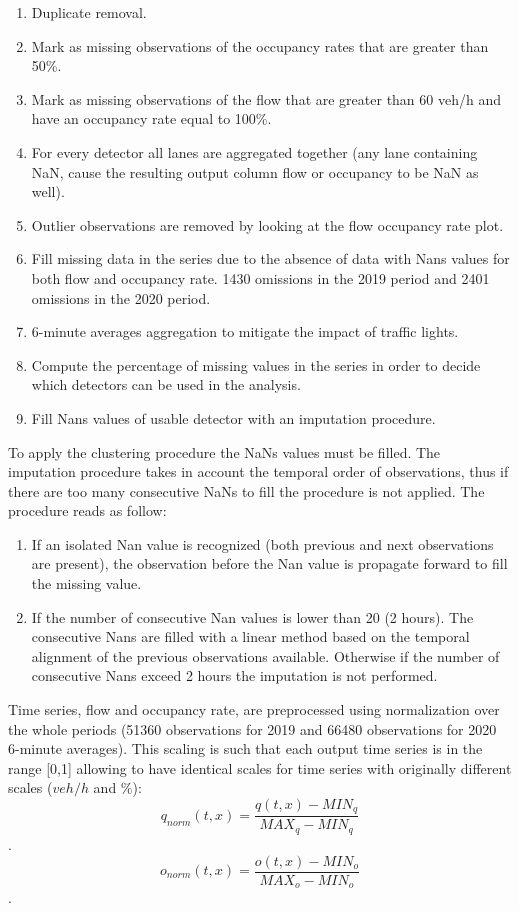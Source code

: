 \documentclass[11pt]{article}
\begin{document}
\begin{enumerate}
\def\labelenumi{\arabic{enumi}.}
\item
  Duplicate removal.
\item
  Mark as missing observations of the occupancy rates that are greater
  than 50\%.
\item
  Mark as missing observations of the flow that are greater than 60
  veh/h and have an occupancy rate equal to 100\%.
\item
  For every detector all lanes are aggregated together (any lane
  containing NaN, cause the resulting output column flow or occupancy to
  be NaN as well).
\item
  Outlier observations are removed by looking at the flow occupancy rate
  plot.
\item
  Fill missing data in the series due to the absence of data with Nans
  values for both flow and occupancy rate. 1430 omissions in the 2019
  period and 2401 omissions in the 2020 period.
\item
  6-minute averages aggregation to mitigate the impact of traffic
  lights.
\item
  Compute the percentage of missing values in the series in order to
  decide which detectors can be used in the analysis.
\item
  Fill Nans values of usable detector with an imputation procedure.
\end{enumerate}

To apply the clustering procedure the NaNs values must be filled. The
imputation procedure takes in account the temporal order of
observations, thus if there are too many consecutive NaNs to fill the
procedure is not applied. The procedure reads as follow:

\begin{enumerate}
\def\labelenumi{\arabic{enumi}.}
\item
  If an isolated Nan value is recognized (both previous and next
  observations are present), the observation before the Nan value is
  propagate forward to fill the missing value.
\item
  If the number of consecutive Nan values is lower than 20 (2 hours).
  The consecutive Nans are filled with a linear method based on the
  temporal alignment of the previous observations available. Otherwise
  if the number of consecutive Nans exceed 2 hours the imputation is not
  performed.
\end{enumerate}

    Time series, flow and occupancy rate, are preprocessed using
normalization over the whole periods (51360 observations for 2019 and
66480 observations for 2020 6-minute averages). This scaling is such
that each output time series is in the range {[}0,1{]} allowing to have
identical scales for time series with originally different scales
(\(veh/h\) and \(\%\)):
\[q_{norm}(t,x)=\frac{q(t,x)-MIN_q}{MAX_q-MIN_q}\].
\[o_{norm}(t,x)=\frac{o(t,x)-MIN_o}{MAX_o-MIN_o}\].
\end{document}
